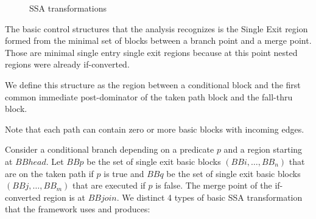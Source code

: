 \begin{figure}[h]
\centering

\caption{SSA transformations}
\label{fig: phi_operations}
\end{figure}

The basic control structures that the analysis recognizes is the Single Exit region formed from the minimal set of blocks between a branch point and a merge point.  Those are minimal single entry single exit regions because at this point nested regions were already if-converted.

 We define this structure as the region between a conditional block and the first common immediate post-dominator of the taken path block and the fall-thru block.

Note that each path can contain zero or more basic blocks with incoming edges.

Consider a conditional branch depending on a predicate $p$ and a region starting at $BBhead$. Let $BBp$ be the set of single exit basic blocks $(BBi,\dots,BB_n)$ that are on the taken path if $p$ is true and $BBq$ be the set of single exit basic blocks $(BBj,\dots,BB_m)$ that are executed if $p$ is false. The merge point of the if-converted region is at $BBjoin$. We distinct 4 types of basic SSA transformation that the framework uses and produces:
